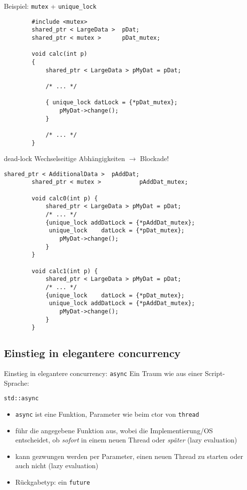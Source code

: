 \begin{frame}[fragile]{ Beispiel: \texttt{mutex} + \texttt{unique\_lock} }
	\begin{lstlisting}
		#include <mutex>
		shared_ptr < LargeData >  pDat;
		shared_ptr < mutex >      pDat_mutex;
		
		void calc(int p)
		{
		    shared_ptr < LargeData > pMyDat = pDat;
			
		    /* ... */
			
		    { unique_lock datLock = {*pDat_mutex};
		        pMyDat->change();
		    }
			
		    /* ... */
		}
	\end{lstlisting}
\end{frame}

\begin{frame}[fragile]{dead-lock}
	\alert{Wechselseitige Abhängigkeiten $\rightarrow$ Blockade!}
	
	\begin{lstlisting}[basicstyle=\scriptsize]
		shared_ptr < AdditionalData >  pAddDat;
		shared_ptr < mutex >           pAddDat_mutex;
		
		void calc0(int p) {
		    shared_ptr < LargeData > pMyDat = pDat;
		    /* ... */
		    {unique_lock addDatLock = {*pAddDat_mutex};
		     unique_lock    datLock = {*pDat_mutex};
		        pMyDat->change();
		    }
		}
		
		void calc1(int p) {
		    shared_ptr < LargeData > pMyDat = pDat;
		    /* ... */
		    {unique_lock    datLock = {*pDat_mutex};
		     unique_lock addDatLock = {*pAddDat_mutex};
		        pMyDat->change();
		    }
		}
	\end{lstlisting}
\end{frame}


\subsection{Einstieg in elegantere concurrency}

\begin{frame}{Einstieg in elegantere concurrency: \texttt{async}}
	Ein Traum wie aus einer Script-Sprache:
	\begin{block}{ \texttt{std::async} }
		\begin{itemize}
			\item \texttt{async} ist eine Funktion, Parameter wie beim ctor von \texttt{thread}
			\item führ die angegebene Funktion aus, wobei die Implementierung/OS entscheidet, ob \emph{sofort} in einem neuen Thread oder \emph{später} (lazy evaluation)
			\item kann gezwungen werden per Parameter, einen neuen Thread zu starten oder auch nicht (lazy evaluation)
			\item Rückgabetyp: ein \texttt{future}
		\end{itemize}
	\end{block}
\end{frame}

